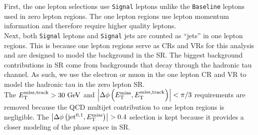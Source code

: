 \indent First, the one lepton selections use {\tt Signal} leptons unlike the {\tt Baseline} leptons used in zero lepton regions.  The one lepton regions use lepton momentum information and therefore require higher quality leptons.  \\

\indent Next, both {\tt Signal} leptons and {\tt Signal} jets are counted as ``jets'' in one lepton regions.  This is because one lepton regions serve as CRs and VRs for this analysis and are designed to model the background in the SR.  The biggest background contributions in SR come from backgrounds that decay through the hadronic tau channel.  As such, we use the electron or muon in the one lepton CR and VR to model the hadronic tau in the zero lepton SR.  \\

\indent The $\mettrk > 30 \gev$ and $\dphimettrk < \pi/3$ requirements are removed because the QCD multijet contribution to one lepton regions is negligible.  The $\left|\Delta\phi\left(\mathrm{jet}^{0,1},E_{\mathrm{T}}^{\mathrm{miss}}\right)\right| > 0.4$ selection is kept because it provides a closer modeling of the phase space in SR. \\